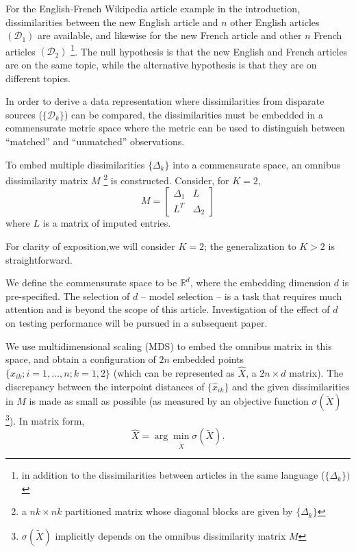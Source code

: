 \documentclass[12pt,oneside,final]{thesis}\usepackage[]{graphicx}\usepackage[]{color}
\begin{document}
For the English-French Wikipedia  article example in the introduction,  dissimilarities between the new English article and $n$ other English articles $(\mathcal{D}_1)$ are available, and likewise for the new French article  and other $n$ French articles $(\mathcal{D}_2)$ \footnote{in addition to the dissimilarities between articles in the same language  ($\{\Delta_k\})$ }. The null hypothesis is that the new English and French articles are on the same topic, while the alternative hypothesis is that they are on different topics.

  In order to derive a data representation where dissimilarities from disparate sources ($\{\mathcal{D}_k\}$)  can be compared, the dissimilarities must be embedded in a commensurate metric space where the metric can be used to distinguish between ``matched'' and ``unmatched'' observations.


To embed multiple dissimilarities  $\{\Delta_k\}$  into a commensurate space, an omnibus dissimilarity matrix  $M$ \footnote{a $nk \times nk$ partitioned matrix whose diagonal blocks are given by $\{\Delta_k\}$ }  is constructed. Consider, for $K=2$,
 \begin{equation}
M=  \left[ \begin{array}{cc}
         \Delta_1 & L\\
        L^T  & \Delta_2 
     \end{array}  \right]     \label{omnibus} 
\end{equation} where $L$ is a matrix of imputed entries.   

\begin{remark}
For clarity of exposition,we will consider $K=2$; the generalization to $K>2$ is straightforward. 
\end{remark}

We define the commensurate space to be  $\mathbb{R}^d$, where the embedding dimension $d$ is pre-specified. The selection of $d$ -- model selection -- is  a task that requires much attention and is  beyond the scope of this article. Investigation of the effect of $d$ on testing performance will be pursued in a  subsequent paper.

 We use multidimensional scaling (MDS) \cite{borg+groenen:1997} to embed  the omnibus matrix in this  space, and obtain  a configuration of $2n$ embedded points $\{\hat{x}_{ik}; i=1,\ldots,n;k=1,2\}$ (which can be represented as $\hat{X}$, a $2n \times d$ matrix). The discrepancy between the interpoint distances of $\{\hat{x}_{ik}\}$ and the given dissimilarities in  $M$ is made as small  as possible (as measured by an objective function $\sigma(\widetilde{X})$ \footnote{$\sigma(\widetilde{X})$ implicitly depends on the omnibus dissimilarity matrix $M$}). In matrix form, $$ \hat{X}=\arg \min_{\tilde{X}} \sigma(\tilde{X}).$$ 
\end{document}
